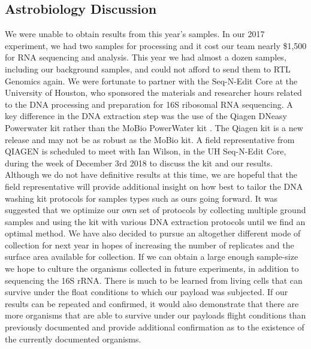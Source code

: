 \subsection{Astrobiology Discussion}
\label{sec:Astrobiology Results Discussion}
We were unable to obtain results from this year’s samples. In our 2017 experiment, we had two samples for processing and it cost our team nearly \$1,500 for RNA sequencing and analysis. This year we had almost a dozen samples, including our background samples, and could not afford to send them to RTL Genomics again. We were fortunate to partner with the Seq-N-Edit Core at the University of Houston, who sponsored the materials and researcher hours related to the DNA processing and preparation for 16S ribosomal RNA sequencing. A key difference in the DNA extraction step was the use of the Qiagen DNeasy Powerwater kit rather than the MoBio PowerWater kit \cite{SORA}. The Qiagen kit is a new release and may not be as robust as the MoBio kit. A field representative from QIAGEN is scheduled to meet with Ian Wilson, in the UH Seq-N-Edit Core, during the week of December 3rd 2018 to discuss the kit and our results. Although we do not have definitive results at this time, we are hopeful that the field representative will provide additional insight on how best to tailor the DNA washing kit protocols for samples types such as ours going forward. It was suggested that we optimize our own set of protocols by collecting multiple ground samples and using the kit with various DNA extraction protocols until we find an optimal method. We have also decided to pursue an altogether different mode of collection for next year in hopes of increasing the number of replicates and the surface area available for collection. If we can obtain a large enough sample-size we hope to culture the organisms collected in future experiments, in addition to sequencing the 16S rRNA. There is much to be learned from living cells that can survive under the float conditions to which our payload was subjected. If our results can be repeated and confirmed, it would also demonstrate that there are more organisms that are able to survive under our payloads flight conditions than previously documented and provide additional confirmation as to the existence of the currently documented organisms.
